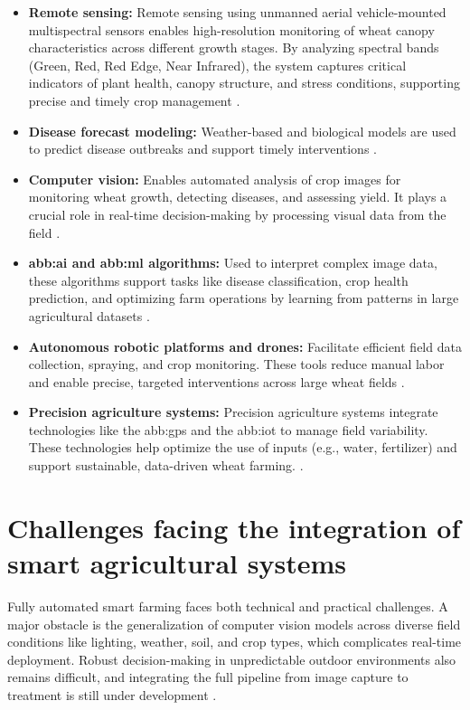 \begin{itemize}
    \item \textbf{Remote sensing:} Remote sensing using unmanned aerial vehicle-mounted multispectral sensors enables high-resolution monitoring of wheat canopy characteristics across different growth stages. By analyzing spectral bands (Green, Red, Red Edge, Near Infrared), the system captures critical indicators of plant health, canopy structure, and stress conditions, supporting precise and timely crop management \parencite{zhang2025precision}.
    \item \textbf{Disease forecast modeling:} Weather-based and biological models are used to predict disease outbreaks and support timely interventions \parencite{mehta2014wheat}.
    \item \textbf{Computer vision:} Enables automated analysis of crop images for monitoring wheat growth, detecting diseases, and assessing yield. It plays a crucial role in real-time decision-making by processing visual data from the field \parencite{ghazal2024computer}.
    \item \textbf{\gls{abb:ai} and \gls{abb:ml} algorithms:} Used to interpret complex image data, these algorithms support tasks like disease classification, crop health prediction, and optimizing farm operations by learning from patterns in large agricultural datasets \parencite{ghazal2024computer}.
    \item \textbf{Autonomous robotic platforms and drones:} Facilitate efficient field data collection, spraying, and crop monitoring. These tools reduce manual labor and enable precise, targeted interventions across large wheat fields \parencite{ghazal2024computer}.
    \item \textbf{Precision agriculture systems:} Precision agriculture systems integrate technologies like the \gls{abb:gps} and the \gls{abb:iot} to manage field variability. These technologies help optimize the use of inputs (e.g., water, fertilizer) and support sustainable, data-driven wheat farming. \parencite{ghazal2024computer}.
\end{itemize}


\section{Challenges facing the integration of smart agricultural systems}
Fully automated smart farming faces both technical and practical challenges. A major obstacle is the generalization of computer vision models across diverse field conditions like lighting, weather, soil, and crop types, which complicates real-time deployment. Robust decision-making in unpredictable outdoor environments also remains difficult, and integrating the full pipeline from image capture to treatment is still under development \parencite{ghazal2024computer}.

